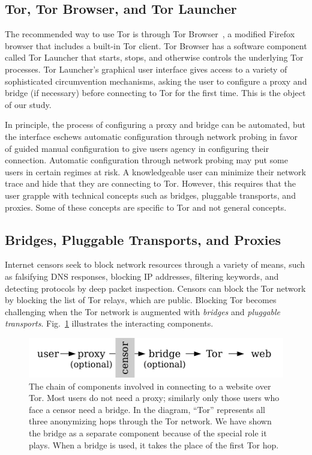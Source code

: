 \documentclass[USenglish,oneside,twocolumn]{article}
\begin{document}
\subsection{Tor, Tor Browser, and Tor Launcher}
The recommended way to use Tor is through Tor Browser~\cite{torbrowser},
a modified Firefox browser that includes a built-in Tor client.
Tor Browser has a software component called Tor Launcher that
starts, stops, and otherwise controls the underlying Tor processes.
Tor Launcher's graphical user interface gives access to a variety of 
sophisticated circumvention mechanisms, asking the user
to configure a proxy and bridge (if necessary) before connecting to Tor
for the first time. This is the object of our study. 

In principle, the process of configuring a proxy and bridge can be automated, but
the interface eschews automatic configuration through network probing
in favor of guided manual configuration to give users agency in configuring their connection. 
Automatic configuration through network probing may put some users in certain regimes at risk. 
A knowledgeable user can minimize their network trace and hide that they are connecting to Tor.
However, this requires that the user grapple with technical concepts such as 
bridges, pluggable transports, and proxies. Some of these concepts are specific to 
Tor and not general concepts.

\subsection{Bridges, Pluggable Transports, and Proxies} 
Internet censors seek to block network resources through 
a variety of means, such as falsifying DNS responses, blocking IP addresses, 
filtering keywords, and detecting protocols by deep packet inspection.
Censors can block the Tor network by blocking the list of Tor relays, which 
are public. Blocking Tor becomes challenging when
the Tor network is augmented with \emph{bridges} and \emph{pluggable transports}.
Fig.~\ref{fig:topology} illustrates the interacting components.

\begin{figure}
\centering
\includegraphics{topology.pdf}
\caption{
The chain of components involved in connecting to a website over Tor.
Most users do not need a proxy;
similarly only those users who face a censor need a bridge.
In the diagram, ``Tor'' represents all three anonymizing hops through the Tor network.
We have shown the bridge as a separate component
because of the special role it plays.
When a bridge is used, it takes the place of the first Tor hop.
}
\label{fig:topology}
\end{figure}
\end{document}
